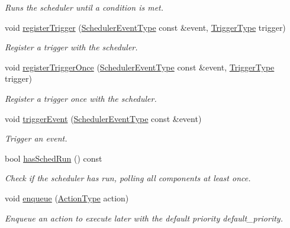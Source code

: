 \begin{DoxyCompactItemize}
\begin{DoxyCompactList}\small\item\em Runs the scheduler until a condition is met. \end{DoxyCompactList}\item 
void \hyperlink{structvt_1_1sched_1_1_scheduler_a818711c413c1ff0e843fffa877c52c78}{register\+Trigger} (\hyperlink{namespacevt_1_1sched_a54756ec39b60951d6765fcfa692d1616}{Scheduler\+Event\+Type} const \&event, \hyperlink{structvt_1_1sched_1_1_scheduler_aa0c06d6e1c31a5f1c3db474036ad7d29}{Trigger\+Type} trigger)
\begin{DoxyCompactList}\small\item\em Register a trigger with the scheduler. \end{DoxyCompactList}\item 
void \hyperlink{structvt_1_1sched_1_1_scheduler_ac6faee91832e52305c2e6ab28e1b3040}{register\+Trigger\+Once} (\hyperlink{namespacevt_1_1sched_a54756ec39b60951d6765fcfa692d1616}{Scheduler\+Event\+Type} const \&event, \hyperlink{structvt_1_1sched_1_1_scheduler_aa0c06d6e1c31a5f1c3db474036ad7d29}{Trigger\+Type} trigger)
\begin{DoxyCompactList}\small\item\em Register a trigger once with the scheduler. \end{DoxyCompactList}\item 
void \hyperlink{structvt_1_1sched_1_1_scheduler_a1bbc574a084b361bf0c88d24882ef08b}{trigger\+Event} (\hyperlink{namespacevt_1_1sched_a54756ec39b60951d6765fcfa692d1616}{Scheduler\+Event\+Type} const \&event)
\begin{DoxyCompactList}\small\item\em Trigger an event. \end{DoxyCompactList}\item 
bool \hyperlink{structvt_1_1sched_1_1_scheduler_ac7a9512a4a616d51915d5dfee84ff986}{has\+Sched\+Run} () const
\begin{DoxyCompactList}\small\item\em Check if the scheduler has run, polling all components at least once. \end{DoxyCompactList}\item 
void \hyperlink{structvt_1_1sched_1_1_scheduler_a82a78f782999127d461208bc948268a4}{enqueue} (\hyperlink{namespacevt_ae0a5a7b18cc99d7b732cb4d44f46b0f3}{Action\+Type} action)
\begin{DoxyCompactList}\small\item\em Enqueue an action to execute later with the default priority {\ttfamily default\+\_\+priority}. \end{DoxyCompactList}\item 

\end{DoxyCompactItemize}
